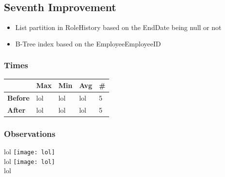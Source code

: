 \documentclass[a4paper, 10pt]{article}
\begin{document}
\subsection{Seventh Improvement}
\begin{itemize}
  \item List partition in RoleHistory based on the EndDate being null or not
  \item B-Tree index based on the EmployeeEmployeeID
\end{itemize}
\subsubsection{Times}
\begin{table}[H]
\begin{tabular}{l|l|l|l|l|}
\cline{2-5}
\textbf{}                             & \textbf{Max} & \textbf{Min} & \textbf{Avg} & \textbf{\#}  \\ \hline
\multicolumn{1}{|l|}{\textbf{Before}} & lol         & lol         & lol          & 5            \\ \hline
\multicolumn{1}{|l|}{\textbf{After}}  & lol         & lol         & lol          & 5            \\ \hline
\end{tabular}
\end{table}
\subsubsection{Observations}
lol
\texttt{[image: lol]}\\ 
lol
\texttt{[image: lol]}\\
lol
\end{document}
